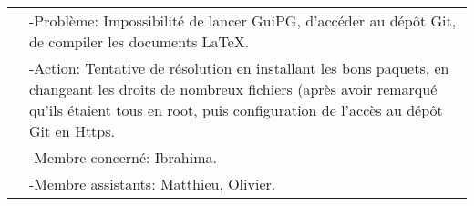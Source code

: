 \documentclass{../res/univ-projet}
\begin{document}
\begin{tabular}{| p{5cm} | p{2.5cm} | p{6.5cm} |}
		\cellcolor{lightgray}						   & \multicolumn{2}{p{9cm}|}{-Problème: Impossibilité de lancer GuiPG, d'accéder au dépôt Git, de compiler les documents LaTeX.} \\
		\cellcolor{lightgray}						   & \multicolumn{2}{p{9cm}|}{-Action: Tentative de résolution en installant les bons paquets, en changeant les droits de nombreux fichiers 
																														(après avoir remarqué qu'ils étaient tous en root, puis configuration de l'accès au dépôt Git en Https.} \\
		\cellcolor{lightgray}						   & \multicolumn{2}{p{9cm}|}{-Membre concerné: Ibrahima.} \\
		\cellcolor{lightgray}						   & \multicolumn{2}{p{9cm}|}{-Membre assistants: Matthieu, Olivier.} \\ \cline{2-3}	
	\end{tabular}
\end{document}
